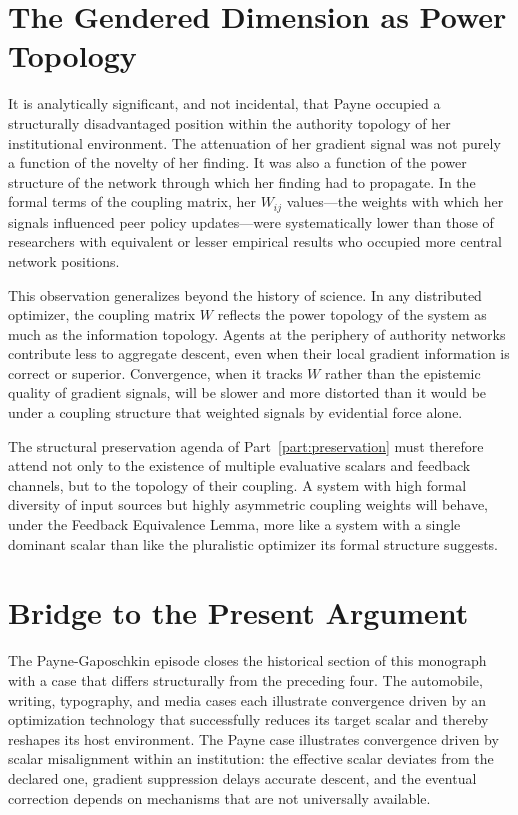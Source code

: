 \documentclass[12pt, oneside]{book}
\theoremstyle{plain}
\theoremstyle{definition}
\theoremstyle{remark}
\theoremstyle{definition}
\begin{document}
\section{The Gendered Dimension as Power Topology}

It is analytically significant, and not incidental, that Payne occupied a structurally
disadvantaged position within the authority topology of her institutional environment.
The attenuation of her gradient signal was not purely a function of the novelty of
her finding. It was also a function of the power structure of the network through
which her finding had to propagate. In the formal terms of the coupling matrix, her
$W_{ij}$ values---the weights with which her signals influenced peer policy
updates---were systematically lower than those of researchers with equivalent or
lesser empirical results who occupied more central network positions.

This observation generalizes beyond the history of science. In any distributed
optimizer, the coupling matrix $W$ reflects the power topology of the system as much
as the information topology. Agents at the periphery of authority networks contribute
less to aggregate descent, even when their local gradient information is correct or
superior. Convergence, when it tracks $W$ rather than the epistemic quality of
gradient signals, will be slower and more distorted than it would be under a
coupling structure that weighted signals by evidential force alone.

The structural preservation agenda of Part~\ref{part:preservation} must therefore
attend not only to the existence of multiple evaluative scalars and feedback channels,
but to the topology of their coupling. A system with high formal diversity of input
sources but highly asymmetric coupling weights will behave, under the Feedback
Equivalence Lemma, more like a system with a single dominant scalar than like the
pluralistic optimizer its formal structure suggests.

\section{Bridge to the Present Argument}

The Payne-Gaposchkin episode closes the historical section of this monograph with a
case that differs structurally from the preceding four. The automobile, writing,
typography, and media cases each illustrate convergence driven by an optimization
technology that successfully reduces its target scalar and thereby reshapes its host
environment. The Payne case illustrates convergence driven by scalar misalignment
within an institution: the effective scalar deviates from the declared one, gradient
suppression delays accurate descent, and the eventual correction depends on mechanisms
that are not universally available.
\end{document}
